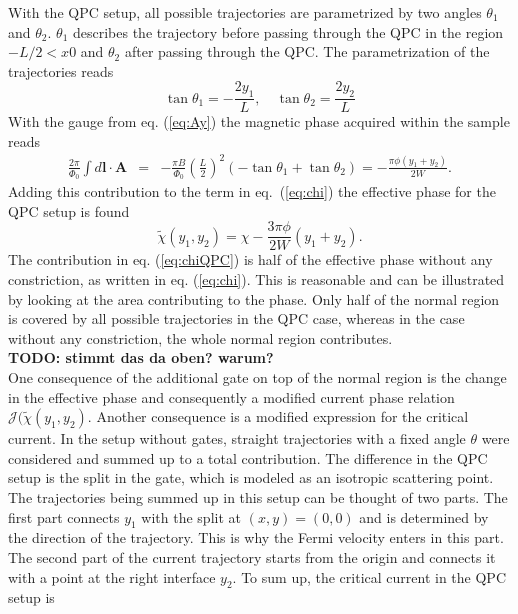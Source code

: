 With the QPC setup, all possible trajectories are parametrized by two angles $\theta_1$ and $\theta_2$. $\theta_1$ describes the trajectory before passing through the QPC in the region $ -L/2 < x 0$ and  $\theta_2$ after passing through the QPC. The parametrization of the trajectories reads
\begin{equation}
\tan \theta_1 = - \frac{2 y_1}{L}, \quad \tan \theta_2 = \frac{2 y_2}{L}
\label{eq:QPCparametrization}
\end{equation}
With the gauge from eq. (\ref{eq:Ay}) the magnetic phase acquired within the sample reads
\begin{eqnarray}
\frac{2\pi}{\Phi_0} \int d\mathbf{l} \cdot \mathbf{A}  &=&
-\frac{\pi B}{\Phi_0}\left(\frac{L}{2}\right)^2
\left(-\tan\theta_1 + \tan\theta_2\right) =
-\frac{\pi \phi (y_1+y_2)}{2 W}.
\label{eq:phaseQPC}
\end{eqnarray}
Adding this contribution to the term in eq.~(\ref{eq:chi}) the effective phase for the QPC setup is found
\begin{equation}
\tilde{\chi}(y_1,y_2)=\chi-\frac{3 \pi \phi }{2W}(y_1+y_2).
\label{eq:chiQPC}
\end{equation}
The contribution in eq. (\ref{eq:chiQPC}) is half of the effective phase without any constriction, as written in eq. (\ref{eq:chi}). This is reasonable and can be illustrated by looking at the area contributing to the phase. Only half of the normal region is covered by all possible trajectories in the QPC case, whereas in the case without any constriction, the whole normal region contributes.\\
\textbf{TODO: stimmt das da oben? warum?}\\
One consequence of the additional gate on top of the normal region is the change in the effective phase and consequently a modified current phase relation $\mathcal{J}(\tilde{\chi}(y_1, y_2)$. Another consequence is a modified expression for the critical current. In the setup without gates, straight trajectories with a fixed angle $\theta$ were considered and summed up to a total contribution. The difference in the QPC setup is the split in the gate, which is modeled as an isotropic scattering point. The trajectories being summed up in this setup can be thought of two parts. The first part connects $y_1$ with the split at $(x, y) = (0, 0)$ and is determined by the direction of the trajectory. This is why the Fermi velocity enters in this part. The second part of the current trajectory starts from the origin and connects it with a point at the right interface $y_2$. To sum up, the  critical current in the QPC setup is
